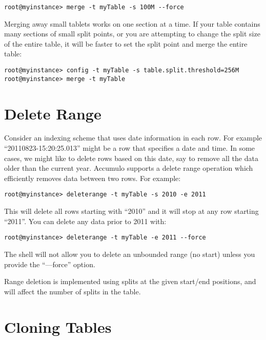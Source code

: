 \small
\begin{verbatim}
root@myinstance> merge -t myTable -s 100M --force
\end{verbatim}
\normalsize

Merging away small tablets works on one section at a time.  If your
table contains many sections of small split points, or you are
attempting to change the split size of the entire table, it will be
faster to set the split point and merge the entire table:

\small
\begin{verbatim}
root@myinstance> config -t myTable -s table.split.threshold=256M
root@myinstance> merge -t myTable
\end{verbatim}
\normalsize

\section{Delete Range}

Consider an indexing scheme that uses date information in each row.
For example ``20110823-15:20:25.013'' might be a row that specifies a
date and time.  In some cases, we might like to delete rows based on
this date, say to remove all the data older than the current year.
Accumulo supports a delete range operation which efficiently
removes data between two rows.  For example:

\small
\begin{verbatim}
root@myinstance> deleterange -t myTable -s 2010 -e 2011
\end{verbatim}
\normalsize

This will delete all rows starting with ``2010'' and it will stop at
any row starting ``2011''.  You can delete any data prior to 2011
with:

\small
\begin{verbatim}
root@myinstance> deleterange -t myTable -e 2011 --force
\end{verbatim}
\normalsize

The shell will not allow you to delete an unbounded range (no start)
unless you provide the ``--{}--force'' option.

Range deletion is implemented using splits at the given start/end
positions, and will affect the number of splits in the table.

\section{Cloning Tables}

